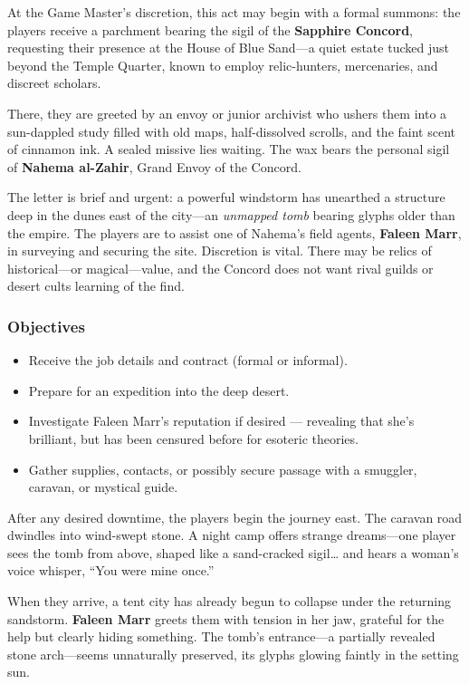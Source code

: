 At the Game Master’s discretion, this act may begin with a formal summons: the players receive a parchment bearing the sigil of the \textbf{Sapphire Concord}, requesting their presence at the House of Blue Sand—a quiet estate tucked just beyond the Temple Quarter, known to employ relic-hunters, mercenaries, and discreet scholars.

There, they are greeted by an envoy or junior archivist who ushers them into a sun-dappled study filled with old maps, half-dissolved scrolls, and the faint scent of cinnamon ink. A sealed missive lies waiting. The wax bears the personal sigil of \textbf{Nahema al-Zahir}, Grand Envoy of the Concord.

The letter is brief and urgent: a powerful windstorm has unearthed a structure deep in the dunes east of the city—an \emph{unmapped tomb} bearing glyphs older than the empire. The players are to assist one of Nahema’s field agents, \textbf{Faleen Marr}, in surveying and securing the site. Discretion is vital. There may be relics of historical—or magical—value, and the Concord does not want rival guilds or desert cults learning of the find.

\vspace{0.5\baselineskip}
\subsubsection{Objectives}
\begin{itemize}
    \item Receive the job details and contract (formal or informal).
    \item Prepare for an expedition into the deep desert.
    \item Investigate Faleen Marr’s reputation if desired — revealing that she’s brilliant, but has been censured before for esoteric theories.
    \item Gather supplies, contacts, or possibly secure passage with a smuggler, caravan, or mystical guide.
\end{itemize}

\vspace{0.5\baselineskip}
After any desired downtime, the players begin the journey east. The caravan road dwindles into wind-swept stone. A night camp offers strange dreams—one player sees the tomb from above, shaped like a sand-cracked sigil… and hears a woman’s voice whisper, “You were mine once.”

When they arrive, a tent city has already begun to collapse under the returning sandstorm. \textbf{Faleen Marr} greets them with tension in her jaw, grateful for the help but clearly hiding something. The tomb’s entrance—a partially revealed stone arch—seems unnaturally preserved, its glyphs glowing faintly in the setting sun.

